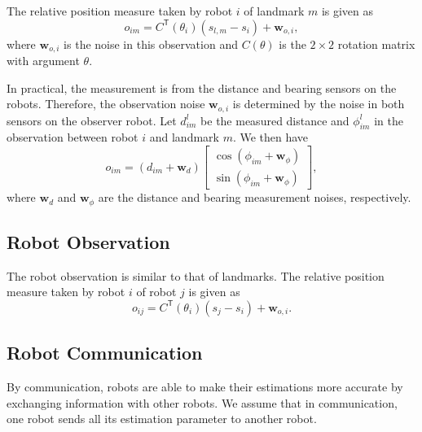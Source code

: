 \documentclass[xcolor=x11names]{article}
\DeclareMathOperator\T{\mathsf{T}}
\begin{document}
   The relative position measure taken by robot $i$ of landmark $m$ is given as
   \begin{equation}
      o_{im} = C^{\T}(\theta_i) (s_{l,m} - s_i) + \mathbf{w}_{o,i},
   \end{equation}
   where $\mathbf{w}_{o,i}$ is the noise in this observation and $C(\theta)$ is the $2\times 2$ rotation matrix with argument $\theta$.
   
   In practical, the measurement is from the distance and bearing sensors on the robots. Therefore, the observation noise $\mathbf{w}_{o,i}$ is determined by the noise in both sensors on the observer robot. Let $d^l_{im}$ be the measured distance and $\phi^l_{im}$ in the observation between robot $i$ and landmark $m$. We then have
   \begin{equation}
      o_{im} = (d_{im} + \mathbf{w}_{d} )
      \begin{bmatrix} 
         \cos ( \phi_{im} + \mathbf{w}_{\phi}) \\  \sin ( \phi_{im} +  \mathbf{w}_{\phi})
      \end{bmatrix},
   \end{equation}   
   where $\mathbf{w}_{d}$ and $\mathbf{w}_{\phi}$ are the distance and bearing measurement noises, respectively.



\subsection{Robot Observation}

   The robot observation is similar to that of landmarks. The relative position measure taken by robot $i$ of robot $j$ is given as
   \begin{equation}
      o_{ij} = C^{\T}(\theta_i) (s_{j} - s_i) + \mathbf{w}_{o,i}.
   \end{equation}


\subsection{Robot Communication}

   By communication, robots are able to make their estimations more accurate by exchanging information with other robots. We assume that in communication, one robot sends all its estimation parameter to another robot.
\end{document}
